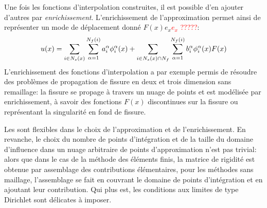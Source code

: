\medskip
Une fois les fonctions d'interpolation construites, il est possible d'en ajouter d'autres par \emph{enrichissement}. L'enrichissement de l'approximation permet ainsi de représenter un mode de déplacement donné $F(x)e_x$\textcolor{red}{$e_x$ ?????}:
\begin{equation}
u(x) = \displaystyle\sum_{i\in N_s(x)}\displaystyle\sum_{\alpha=1}^{N_f(i)} a_i^\alpha \phi_i^\alpha(x) + \displaystyle\sum_{i\in N_s(x)\cap N_f}\displaystyle\sum_{\alpha=1}^{N_f(i)} b_i^\alpha\phi_i^\alpha(x)F(x)
\end{equation}
L'enrichissement des fonctions d'interpolation a par exemple permis de résoudre des problèmes de propagation de fissure en deux et trois dimension sans remaillage: la fissure se propage à travers un nuage de points et est modélisée par enrichissement, à savoir des fonctions $F(x)$ discontinues sur la fissure ou représentant la singularité en fond de fissure.

\medskip
Les  sont flexibles dans le choix de l'approximation et de l'enrichissement. En revanche, le choix du nombre de points d'intégration et de la taille du domaine d'influence dans un nuage arbitraire de points d'approximation n'est pas trivial: alors que dans le cas de la méthode des éléments finis, la matrice de rigidité est obtenue par assemblage des contributions élémentaires, pour les méthodes sans maillage, l'assemblage se fait en couvrant le domaine de points d'intégration et en ajoutant leur contribution. Qui plus est, les conditions aux limites de type Dirichlet sont délicates à imposer.



\medskip
